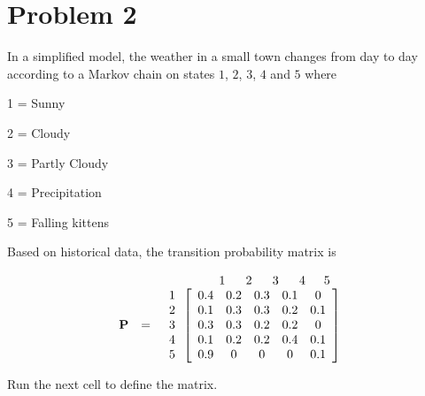 \documentclass[11pt]{article}
\begin{document}
    \hypertarget{problem-2}{%
\section{Problem 2}\label{problem-2}}

In a simplified model, the weather in a small town changes from day to
day according to a Markov chain on states \(1\), \(2\), \(3\), \(4\) and
\(5\) where

1 = Sunny

2 = Cloudy

3 = Partly Cloudy

4 = Precipitation

5 = Falling kittens

Based on historical data, the transition probability matrix is

\[
\begin{array}{lcr} && 1\,\,\,\,\,\,\,\,\,\,2\,\,\,\,\,\,\,\,\,\,3\,\,\,\,\,\,\,\,\,\,4\,\,\,\,\,\,\,\,\,5\,\,\,\,\,\\
\bf{P} &=& \begin{array}{c} 1\\2\\3\\4\\5\end{array}\left[ 
\begin{array}{ccccc}
0.4 & 0.2 & 0.3 & 0.1&0 \\
0.1 & 0.3 & 0.3 & 0.2 &0.1\\
0.3 & 0.3 & 0.2 & 0.2&0 \\
0.1 & 0.2 & 0.2 & 0.4&0.1\\
0.9 & 0 & 0 & 0&0.1\\
\end{array}
\right]
\end{array}
\]

Run the next cell to define the matrix.
\end{document}

